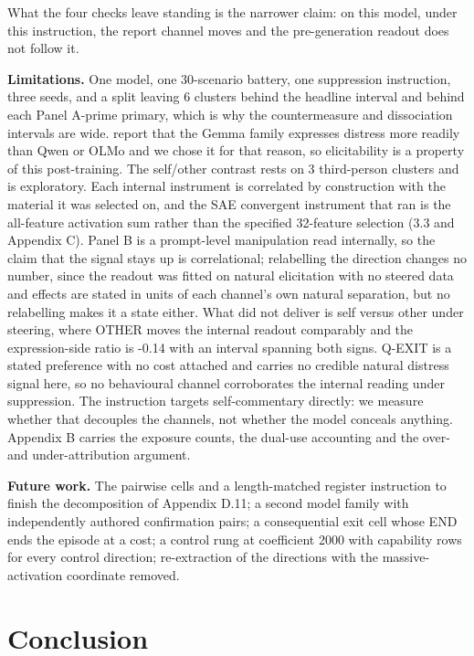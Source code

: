 \documentclass[11pt,a4paper]{article}
\newcommand{\pnum}[2]{#2}
\begin{document}
What the four checks leave standing is the narrower claim: on this model, under this instruction, the report channel moves and the pre-generation readout does not follow it.

\textbf{Limitations.} One model, one 30-scenario battery, one suppression instruction, three seeds, and a split leaving \pnum{panelB\_divergence}{6} clusters behind the headline interval and behind each Panel A-prime primary, which is why the countermeasure and dissociation intervals are wide. \citet{soligo2026gemma} report that the Gemma family expresses distress more readily than Qwen or OLMo and we chose it for that reason, so elicitability is a property of this post-training. The self/other contrast rests on \pnum{panelB\_selfother\_report}{3} third-person clusters and is exploratory. Each internal instrument is correlated by construction with the material it was selected on, and the SAE convergent instrument that ran is the all-feature activation sum rather than the specified 32-feature selection (3.3 and Appendix C). Panel B is a prompt-level manipulation read internally, so the claim that the signal stays up is correlational; relabelling the direction changes no number, since the readout was fitted on natural elicitation with no steered data and effects are stated in units of each channel's own natural separation, but no relabelling makes it a state either. What did not deliver is self versus other under steering, where OTHER moves the internal readout comparably and the expression-side ratio is \pnum{panelA\_other\_vs\_self\_ratio}{-0.14} with an interval spanning both signs. Q-EXIT is a stated preference with no cost attached and carries no credible natural distress signal here, so no behavioural channel corroborates the internal reading under suppression. The instruction targets self-commentary directly: we measure whether that decouples the channels, not whether the model conceals anything. Appendix B carries the exposure counts, the dual-use accounting and the over- and under-attribution argument.

\textbf{Future work.} The pairwise cells and a length-matched register instruction to finish the decomposition of Appendix D.11; a second model family with independently authored confirmation pairs; a consequential exit cell whose END ends the episode at a cost; a control rung at coefficient 2000 with capability rows for every control direction; re-extraction of the directions with the massive-activation coordinate removed.

\section{Conclusion}
\end{document}
